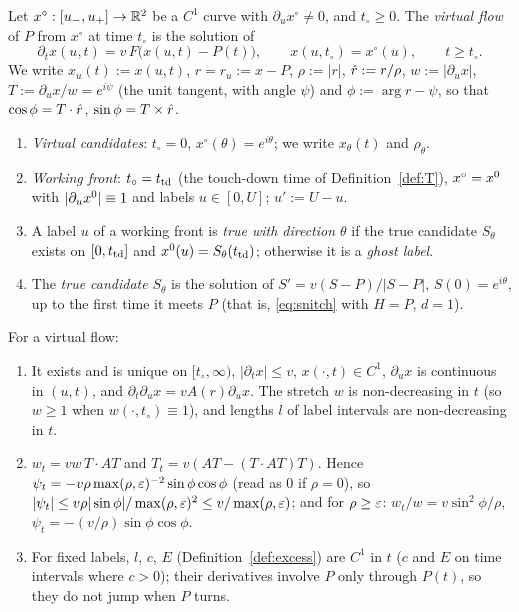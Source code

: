 \begin{definition}\label{def:flow}
Let $x^\circ:[u_-,u_+]\to\mathbb{R}^2$ be a $C^1$ curve with $\partial_ux^\circ\ne0$, and $t_\circ\ge0$. The \emph{virtual flow} of $P$
from $x^\circ$ at time $t_\circ$ is the solution of
\[
\partial_tx(u,t)=v\,F\bigl(x(u,t)-P(t)\bigr),\qquad x(u,t_\circ)=x^\circ(u),\qquad t\ge t_\circ .
\]
We write $x_u(t):=x(u,t)$, $r=r_u:=x-P$, $\rho:=|r|$, $\hat r:=r/\rho$, $w:=|\partial_ux|$, $T:=\partial_ux/w=e^{i\psi}$ (the unit
tangent, with angle $\psi$) and $\phi:=\arg r-\psi$, so that $\cos\phi=T\cdot\hat r$, $\sin\phi=T\times\hat r$.
\begin{enumerate}
\item[(a)] \emph{Virtual candidates}: $t_\circ=0$, $x^\circ(\theta)=e^{i\theta}$; we write $x_\theta(t)$ and $\rho_\theta$.
\item[(b)] \emph{Working front}: $t_\circ=t_{\mathrm{td}}$ (the touch-down time of Definition~\ref{def:T}), $x^\circ=x^0$ with
$|\partial_ux^0|\equiv1$ and labels $u\in[0,U]$; $u':=U-u$.
\item[(c)] A label $u$ of a working front is \emph{true with direction $\theta$} if the true candidate $S_\theta$ exists on
$[0,t_{\mathrm{td}}]$ and $x^0(u)=S_\theta(t_{\mathrm{td}})$; otherwise it is a \emph{ghost label}.
\item[(d)] The \emph{true candidate} $S_\theta$ is the solution of $S'=v(S-P)/|S-P|$, $S(0)=e^{i\theta}$, up to the first time
it meets $P$ (that is, \eqref{eq:snitch} with $H=P$, $d=1$).
\end{enumerate}
\end{definition}

\begin{lemma}\label{lem:flow}
For a virtual flow:
\begin{enumerate}
\item[(a)] It exists and is unique on $[t_\circ,\infty)$, $|\partial_tx|\le v$, $x(\cdot,t)\in C^1$, $\partial_ux$ is continuous in
$(u,t)$, and $\partial_t\partial_ux=vA(r)\partial_ux$. The stretch $w$ is non-decreasing in $t$ (so $w\ge1$ when
$w(\cdot,t_\circ)\equiv1$), and lengths $l$ of label intervals are non-decreasing in $t$.
\item[(b)] $w_t=vw\,T\cdot AT$ and $T_t=v(AT-(T\cdot AT)T)$. Hence $\psi_t=-v\rho\max(\rho,\varepsilon)^{-2}\sin\phi\cos\phi$ \textup(read
as $0$ if $\rho=0$\textup), so $|\psi_t|\le v\rho|\sin\phi|/\max(\rho,\varepsilon)^2\le v/\max(\rho,\varepsilon)$; and for $\rho\ge\varepsilon$:
$w_t/w=v\sin^2\!\phi/\rho$, $\psi_t=-(v/\rho)\sin\phi\cos\phi$.
\item[(c)] For fixed labels, $l$, $c$, $E$ \textup(Definition~\ref{def:excess}\textup) are $C^1$ in $t$ \textup($c$ and $E$ on
time intervals where $c>0$\textup); their derivatives involve $P$ only through $P(t)$, so they do not jump when $P$ turns.
\end{enumerate}
\end{lemma}

